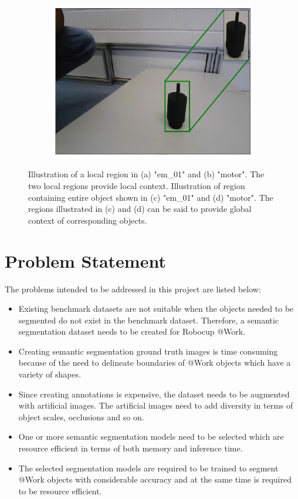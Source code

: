 \begin{figure}[h]
\begin{subfigure}{.4\textwidth}
			\caption{}
			\label{Fig:em01g}
		\end{subfigure}
		\begin{subfigure}{.4\textwidth}
			\centering
			\includegraphics[width=.9\linewidth]{images/motor_context_g}
			\caption{}
			\label{Fig:motorg}
		\end{subfigure}
		\caption{Illustration of a local region in (a) "em\_01" and (b) "motor". The two local regions provide local context. Illustration of region containing entire object shown in (c) "em\_01" and (d) "motor". The regions illustrated in (c) and (d) can be said to provide global context of corresponding objects.}
		\label{Fig:context}
	\end{figure}

\section{Problem Statement}

The problems intended to be addressed in this project are listed below:

	\begin{itemize}
		\item Existing benchmark datasets are not suitable when the objects needed to be segmented do not exist in the benchmark dataset. Therefore, a semantic segmentation dataset needs to be created for Robocup @Work.
		\item Creating semantic segmentation ground truth images is time consuming because of the need to delineate boundaries of @Work objects which have a variety of shapes.
		\item Since creating annotations is expensive, the dataset needs to be augmented with artificial images. The artificial images need to add diversity in terms of object scales, occlusions and so on.
		\item One or more semantic segmentation models need to be selected which are resource efficient in terms of both memory and inference time. 
		\item The selected segmentation models are required to be trained to segment @Work objects with considerable accuracy and at the same time is required to be resource efficient.
	\end{itemize}